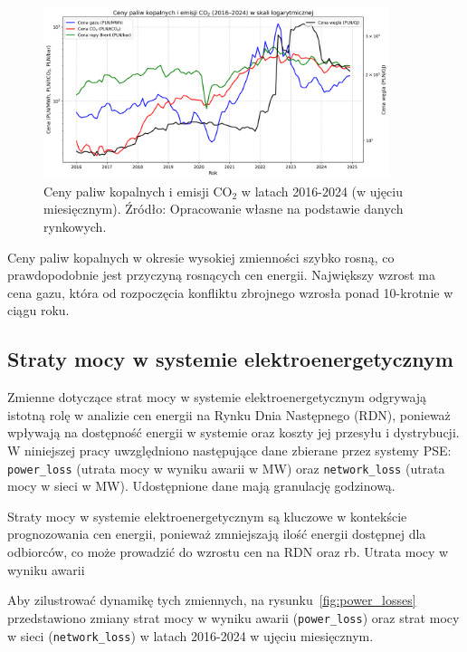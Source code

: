 \begin{figure}[h]
    \centering
    \includegraphics[width=0.9\textwidth]{../plots/fuels/fuel_prices_2016_2024.png}
    \caption{Ceny paliw kopalnych i emisji CO$_2$ w latach 2016-2024 (w ujęciu miesięcznym). Źródło: Opracowanie własne na podstawie danych rynkowych.}
    \label{fig:fuel_prices}
\end{figure}

Ceny paliw kopalnych w okresie wysokiej zmienności szybko rosną, co prawdopodobnie jest przyczyną rosnących cen energii. Największy wzrost ma cena gazu, która od rozpoczęcia konfliktu zbrojnego wzrosła ponad 10-krotnie w ciągu roku. 

\subsection{Straty mocy w systemie elektroenergetycznym}
\label{subsec:losses}

Zmienne dotyczące strat mocy w systemie elektroenergetycznym odgrywają istotną rolę w analizie cen energii na Rynku Dnia Następnego (RDN), ponieważ wpływają na dostępność energii w systemie oraz koszty jej przesyłu i dystrybucji. W niniejszej pracy uwzględniono następujące dane zbierane przez systemy PSE: \texttt{power\_loss} (utrata mocy w wyniku awarii w MW) oraz \texttt{network\_loss} (utrata mocy w sieci w MW). Udostępnione dane mają granulację godzinową. 

Straty mocy w systemie elektroenergetycznym są kluczowe w kontekście prognozowania cen energii, ponieważ zmniejszają ilość energii dostępnej dla odbiorców, co może prowadzić do wzrostu cen na RDN oraz \gls{rb}. Utrata mocy w wyniku awarii

Aby zilustrować dynamikę tych zmiennych, na rysunku~\ref{fig:power_losses} przedstawiono zmiany strat mocy w wyniku awarii (\texttt{power\_loss}) oraz strat mocy w sieci (\texttt{network\_loss}) w latach 2016-2024 w ujęciu miesięcznym.

